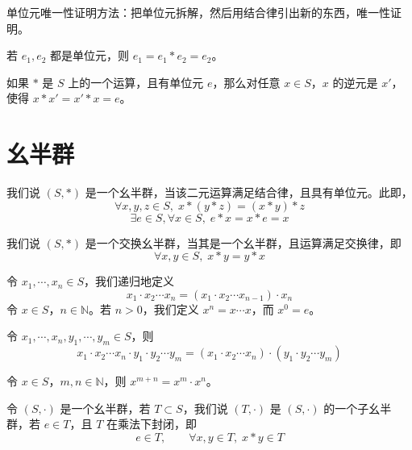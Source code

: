 \begin{note}[单位元唯一性证明]
单位元唯一性证明方法：把单位元拆解，然后用结合律引出新的东西，唯一性证明。

若 $e_1,e_2$ 都是单位元，则 $e_1=e_1*e_2=e_2$。
\end{note}

\begin{definition}[逆元]
如果 $*$ 是 $S$ 上的一个运算，且有单位元 $e$，那么对任意 $x\in S$，$x$ 的逆元是 $x'$，使得 $x*x'=x'*x=e$。
\end{definition}

\section{幺半群}

\begin{definition}[幺半群（定义 1.1）]
我们说 $(S,*)$ 是一个幺半群，当该二元运算满足结合律，且具有单位元。此即，
\[
\forall x,y,z\in S,\;x*(y*z)=(x*y)*z
\]
\[
\exists e\in S,\forall x\in S,\;e*x=x*e=x
\]
\end{definition}

\begin{definition}[交换幺半群（定义 1.2）]
我们说 $(S,*)$ 是一个交换幺半群，当其是一个幺半群，且运算满足交换律，即
\[
\forall x,y\in S,\;x*y=y*x
\]
\end{definition}

\begin{definition}[幂（定义 1.3）]
令 $x_1,\cdots,x_n\in S$，我们递归地定义
\[
x_1\cdot x_2\cdots x_n=(x_1\cdot x_2\cdots x_{n-1})\cdot x_n
\]
令 $x\in S$，$n\in\mathbb{N}$。若 $n>0$，我们定义 $x^n=x\cdots x$，而 $x^0=e$。
\end{definition}

\begin{proposition}[广义结合律（命题 1.2）]
令 $x_1,\cdots,x_n,y_1,\cdots,y_m\in S$，则
\[
x_1\cdot x_2\cdots x_n\cdot y_1\cdot y_2\cdots y_m=(x_1\cdot x_2\cdots x_n)\cdot(y_1\cdot y_2\cdots y_m)
\]
\end{proposition}

\begin{proposition}[命题 1.3]
令 $x\in S$，$m,n\in\mathbb{N}$，则 $x^{m+n}=x^m\cdot x^n$。
\end{proposition}

\begin{definition}[子幺半群（定义 1.4）]
令 $(S,\cdot)$ 是一个幺半群，若 $T\subset S$，我们说 $(T,\cdot)$ 是 $(S,\cdot)$ 的一个子幺半群，若 $e\in T$，且 $T$ 在乘法下封闭，即
\[
e\in T,\qquad\forall x,y\in T,\;x*y\in T
\]
\end{definition}

